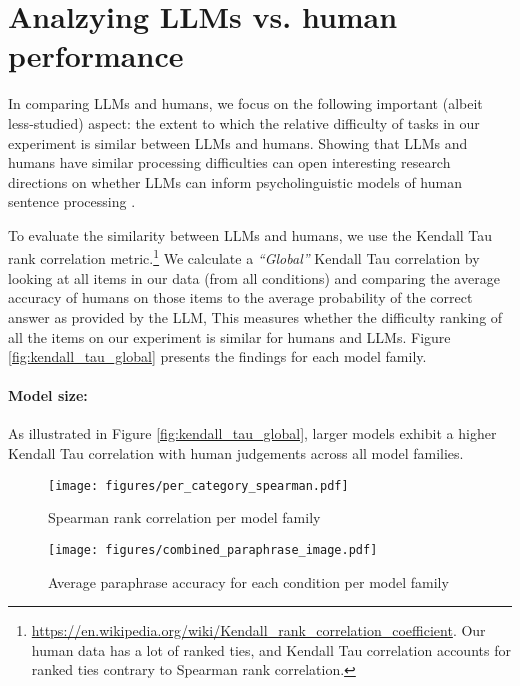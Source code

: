 \section{Analzying LLMs vs. human performance}

In comparing LLMs and humans, we focus on the following important (albeit less-studied) aspect: the extent to which the relative difficulty of tasks in our experiment is similar between LLMs and humans. Showing that LLMs and humans have similar processing difficulties can open interesting research directions on whether LLMs can inform psycholinguistic models of human sentence processing \cite{kuribayashi2025large}.

To evaluate the similarity between LLMs and humans, we use the Kendall Tau rank correlation metric.\footnote{\url{https://en.wikipedia.org/wiki/Kendall_rank_correlation_coefficient}. Our human data has a lot of ranked ties, and Kendall Tau correlation accounts for ranked ties contrary to Spearman rank correlation.} We calculate a \emph{``Global''} Kendall Tau correlation by looking at all items in our data (from all conditions) and comparing the average accuracy of humans on those items to the average probability of the correct answer as provided by the LLM, 
This measures whether the difficulty ranking of all the items on our experiment is similar for humans and LLMs. Figure \ref{fig:kendall_tau_global} presents the findings for each model family.

\paragraph{Model size:} As illustrated in Figure \ref{fig:kendall_tau_global}, larger models exhibit a higher Kendall Tau correlation with human judgements across all model families.

\begin{figure}[t!]
    \centering
    \scriptsize
    \texttt{[image: figures/per\_category\_spearman.pdf]}
    \caption{Spearman rank correlation per model family}
    \label{fig:spearman_per_category}
\end{figure}

\begin{figure*}[t!]
    \centering
    \scriptsize
    \texttt{[image: figures/combined\_paraphrase\_image.pdf]}
    \caption{Average paraphrase accuracy for each condition per model family}
    \label{fig:paraphrase_acc}
\end{figure*}

